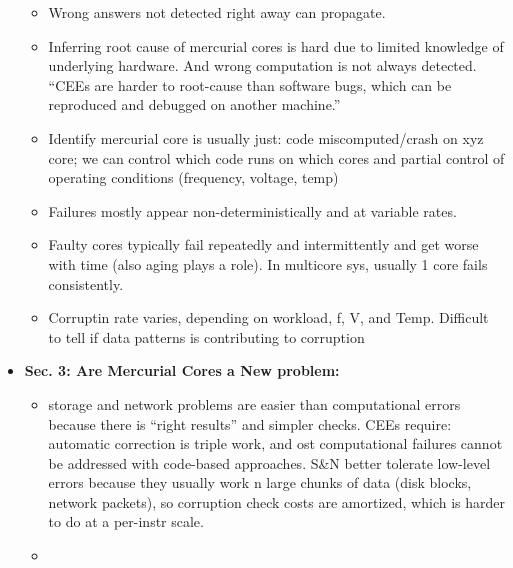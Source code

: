 \documentclass [12pt]{article}
\begin{document}
\begin{itemize}
\begin{itemize}
                    \item Wrong answers not detected right away can propagate. 
                    \item Inferring root cause of mercurial cores is hard due to limited knowledge of underlying hardware. And wrong computation is not always detected. ``CEEs are harder to root-cause than software bugs, which can be reproduced and debugged on another machine.''
                    \item Identify mercurial core is usually just: code miscomputed/crash on xyz core; we can control which code runs on which cores and partial control of operating conditions (frequency, voltage, temp)
                    \item Failures mostly appear non-deterministically and at variable rates. 
                    \item Faulty cores typically fail repeatedly and intermittently and get worse with time (also aging plays a role). In multicore sys, usually 1 core fails consistently. 
                    \item Corruptin rate varies, depending on workload, f, V, and Temp. Difficult to tell if data patterns is contributing to corruption 
                \end{itemize}
            \item \textbf{Sec. 3: Are Mercurial Cores a New problem:}
                \begin{itemize}
                    \item storage and network problems are easier than computational errors because there is ``right results'' and simpler checks. CEEs require: automatic correction is triple work, and ost computational failures cannot be addressed with code-based approaches. S\&N better tolerate low-level errors because they usually work n large chunks of data (disk blocks, network packets), so corruption check costs are amortized, which is harder to do at a per-instr scale. 
                    \item 
                \end{itemize}


\end{itemize}
\end{document}

